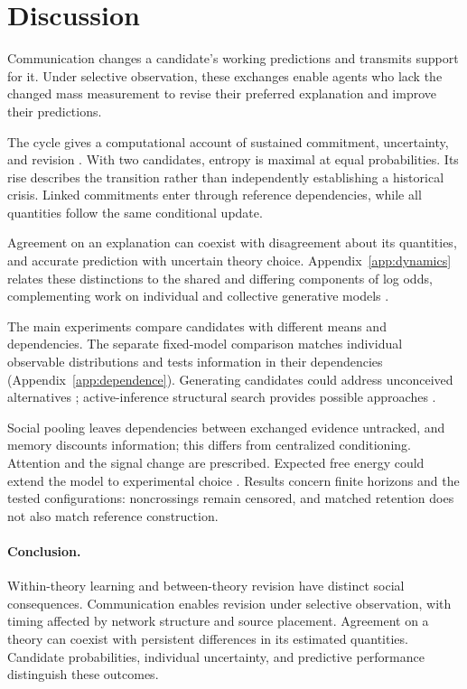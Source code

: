 \documentclass[runningheads]{llncs}
\begin{document}
\section{Discussion}
\label{sec:discussion}
Communication changes a candidate's working predictions and transmits support
for it. Under selective observation, these exchanges enable agents who lack the
changed mass measurement to revise their preferred explanation and improve their
predictions.

The cycle gives a computational account of sustained commitment, uncertainty,
and revision \citep{kuhn1962}. With two candidates, entropy is maximal at equal
probabilities. Its rise describes the transition rather than independently
establishing a historical crisis. Linked commitments enter
through reference dependencies, while all quantities follow the same conditional
update.

Agreement on an explanation can coexist with disagreement about its quantities,
and accurate prediction with uncertain theory choice. Appendix~\ref{app:dynamics}
relates these distinctions to the shared and differing components of log odds,
complementing work on individual and collective generative models \citep{waade2025}.

The main experiments compare candidates with different means and dependencies.
The separate fixed-model comparison matches individual observable distributions
and tests information in their dependencies (Appendix~\ref{app:dependence}).
Generating candidates could address unconceived alternatives \citep{stanford2006};
active-inference structural search provides possible approaches
\citep{smith2020structure,neacsu2022}.

Social pooling leaves dependencies between exchanged evidence untracked, and
memory discounts information; this differs from centralized conditioning.
Attention and the signal change are prescribed. Expected free energy could
extend the model to experimental choice \citep{friston2015,millidge2021}.
Results concern finite horizons and the tested configurations: noncrossings
remain censored, and matched retention does not also match reference construction.

\paragraph{Conclusion.}
Within-theory learning and between-theory revision have distinct social
consequences. Communication enables revision under selective observation, with
timing affected by network structure and source placement. Agreement on a theory
can coexist with persistent differences in its estimated quantities. Candidate
probabilities, individual uncertainty, and predictive performance distinguish
these outcomes.
\label{endmain}
\end{document}
